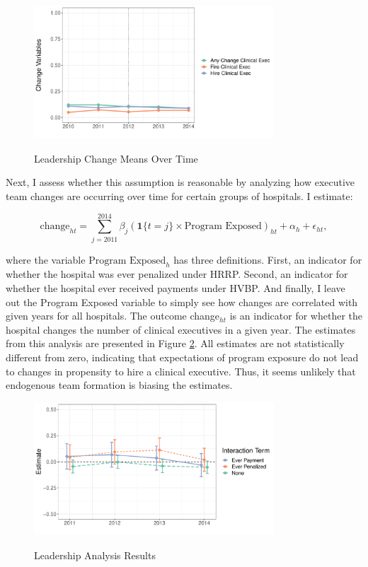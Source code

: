 \documentclass[12pt]{article}
\begin{document}
    \begin{figure}[ht!]
    \centering
    \caption{Leadership Change Means Over Time}
    \includegraphics[width=0.8\textwidth]{Objects/change_means.pdf}
    \label{fig:change_means}
     \end{figure}

    Next, I assess whether this assumption is reasonable by analyzing how executive team changes are occurring over time for certain groups of hospitals. I estimate:

    \begin{equation}\label{eq:change2}
    \text{change}_{ht} = \sum_{j=2011}^{2014}\beta_j(\mathbf{1}\{t=j\}\times \text{Program Exposed})_{ht} + \alpha_h + \epsilon_{ht},
    \end{equation}

    where the variable $\text{Program Exposed}_{h}$ has three definitions. First, an indicator for whether the hospital was ever penalized under HRRP. Second, an indicator for whether the hospital ever received payments under HVBP. And finally, I leave out the Program Exposed variable to simply see how changes are correlated with given years for all hospitals. The outcome change$_{ht}$ is an indicator for whether the hospital changes the number of clinical executives in a given year. The estimates from this analysis are presented in Figure \ref{fig:change_analysis}. All estimates are not statistically different from zero, indicating that expectations of program exposure do not lead to changes in propensity to hire a clinical executive. Thus, it seems unlikely that endogenous team formation is biasing the estimates. 

     \begin{figure}[ht!]
         \centering
         \caption{Leadership Analysis Results}
         \includegraphics[width=0.8\textwidth]{Objects/change_analysis_plot.pdf}
         \label{fig:change_analysis}
     \end{figure}
\end{document}
